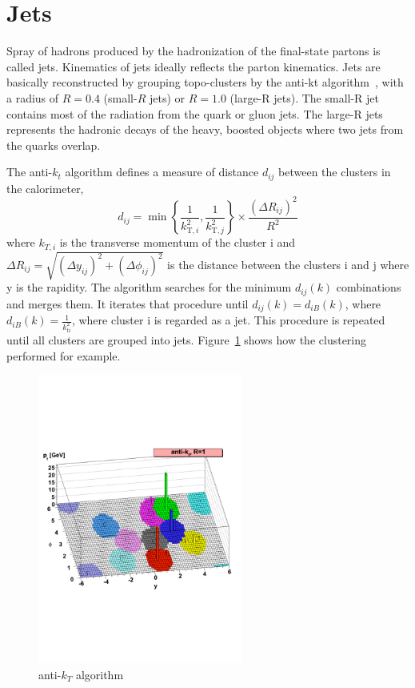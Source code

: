\section{Jets}
Spray of hadrons produced by the hadronization of the final-state partons is called jets.
Kinematics of jets ideally reflects the parton kinematics.
Jets are basically reconstructed by grouping topo-clusters by the anti-kt algorithm~\cite{Cacciari_2008}, with a radius of $R = 0.4$ (small-$R$ jets) or $R = 1.0$ (large-R jets). 
The small-R jet contains most of the radiation from the quark or gluon jets. 
The large-R jets represents the hadronic decays of the heavy, boosted objects where two jets from the quarks overlap.

The anti-$k_t$ algorithm defines a measure of distance $d_{ij}$ between the clusters in the calorimeter,
\begin{equation}
d_{i j}=\min \left\{\frac{1}{k_{\mathrm{T}, i}^{2}}, \frac{1}{k_{\mathrm{T}, j}^{2}}\right\} \times \frac{\left(\Delta R_{i j}\right)^{2}}{R^{2}}
\end{equation}
where $k_{T,i}$ is the transverse momentum of the cluster i and $\Delta R_{i j}=\sqrt{\left(\Delta y_{i j}\right)^{2}+\left(\Delta \phi_{i j}\right)^{2}}$ is the distance between the clusters i and j where y is the rapidity. 
The algorithm searches for the minimum $d_{i j}(k)$ combinations and merges them. 
It iterates that procedure until $d_{i j}(k) = d_{i B}(k)$, where $d_{i B}(k) = \frac{1}{k^2_{ti}}$, where cluster i is regarded as a jet.
This procedure is repeated until all clusters are grouped into jets.
Figure~\ref{fig:antikt} shows how the clustering performed for example.
\begin{figure}[tbp]
\begin{center}
 \includegraphics[width=0.60\textwidth,keepaspectratio]{figures/Reconstruction/antikt}
\caption{
anti-$k_T$ algorithm \cite{Cacciari_2008}
}
\label{fig:antikt}
\end{center}
\end{figure}


